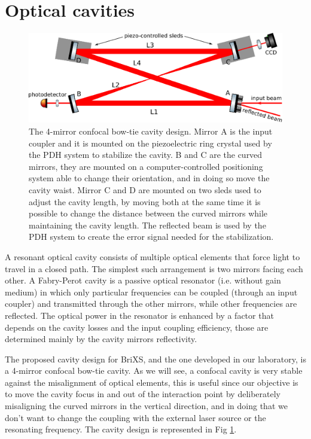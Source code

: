 \section{Optical cavities}
\begin{figure}
	\centering
	\includegraphics[width=1\linewidth]{images/cavity.eps}
	\caption{The 4-mirror confocal bow-tie cavity design. Mirror A is the input coupler and it is mounted on the piezoelectric ring crystal used by the PDH system to stabilize the cavity. B and C are the curved mirrors, they are mounted on a computer-controlled positioning system able to change their orientation, and in doing so move the cavity waist. Mirror C and D are mounted on two sleds used to adjust the cavity length, by moving both at the same time it is possible to change the distance between the curved mirrors while maintaining the cavity length. The reflected beam is used by the PDH system to create the error signal needed for the stabilization.}
	\label{fig:cavity}
\end{figure}

A resonant optical cavity consists of multiple optical elements that force light to travel in a closed path. The simplest such arrangement is two mirrors facing each other. A Fabry-Perot cavity is a passive optical resonator (i.e. without gain medium) in which only particular frequencies can be coupled (through an input coupler) and transmitted through the other mirrors, while other frequencies are reflected.
The optical power in the resonator is enhanced by a factor that depends on the cavity losses and the input coupling efficiency, those are determined mainly by the cavity mirrors reflectivity.

The proposed cavity design for BriXS, and the one developed in our laboratory, is a 4-mirror confocal bow-tie cavity. As we will see, a confocal cavity is very stable against the misalignment of optical elements, this is useful since our objective is to move the cavity focus in and out of the interaction point by deliberately misaligning the curved mirrors in the vertical direction, and in doing that we don't want to change the coupling with the external laser source or the resonating frequency. The cavity design is represented in Fig \ref{fig:cavity}.


